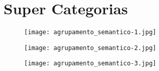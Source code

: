 \chapter{Super Categorias}

\begin{figure}[ht]
\begin{center}
\texttt{[image: agrupamento\_semantico-1.jpg]}
\end{center}
\end{figure}


\begin{figure}[ht]
\begin{center}
\texttt{[image: agrupamento\_semantico-2.jpg]}
\end{center}
\end{figure}

    
\begin{figure}[ht]
\begin{center}
\texttt{[image: agrupamento\_semantico-3.jpg]}
\end{center}
\end{figure}
        
